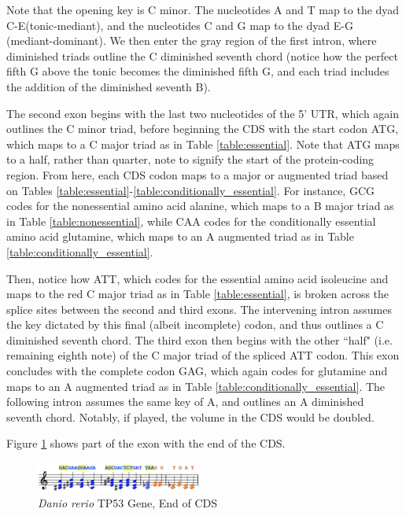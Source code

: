 \documentclass[letterpaper]{article}
\begin{document}
Note that the opening key is C minor. The nucleotides  A and T map to the dyad C-E\musFlat \;(tonic-mediant), and the nucleotides C and G map to the dyad E\musFlat-G (mediant-dominant). We then enter the gray region of the first intron, where diminished triads outline the C diminished seventh chord (notice how the perfect fifth G above the tonic becomes the diminished fifth G\musFlat, and each triad includes the addition of the diminished seventh B\musDoubleFlat).


The second exon begins with the last two nucleotides of the 5’ UTR, which again outlines the C minor triad, before beginning the CDS with the start codon ATG, which maps to a C major triad as in Table \ref{table:essential}. Note that ATG maps to a half, rather than quarter, note to signify the start of the protein-coding region. From here, each CDS codon maps to a major or augmented triad based on Tables  \ref{table:essential}-\ref{table:conditionally_essential}. For instance, GCG codes for the nonessential amino acid alanine, which maps to a B\musFlat\; major triad as in Table \ref{table:nonessential}, while CAA codes for the conditionally essential amino acid glutamine, which maps to an A augmented triad as in Table \ref{table:conditionally_essential}.

Then, notice how ATT, which codes for the essential amino acid isoleucine and maps to the red C\musSharp\; major triad as in Table \ref{table:essential}, is broken across the splice sites between the second and third exons. The intervening intron assumes the key dictated by this final (albeit incomplete) codon, and thus outlines a C\musSharp \; diminished seventh chord. The third exon then begins with the other ``half" (i.e.  remaining eighth note) of the C\musSharp\; major triad of the spliced ATT codon. This exon concludes with the complete codon GAG, which again codes for glutamine and maps to an A augmented triad as in Table \ref{table:conditionally_essential}. The following intron assumes the same key of A, and outlines an A \; diminished seventh chord. Notably, if played, the volume in the CDS would be doubled.

Figure \ref{fig:danio_rerio_end_translation} shows part of the exon with the end of the CDS. 

\begin{figure}[h!]
\centering
\vspace{-4mm}
\includegraphics[width=0.48\textwidth]{images/danio_rerio_end_translation}
  \caption{\textit{Danio rerio} TP53 Gene, End of CDS}
  \label{fig:danio_rerio_end_translation}
  \vspace{-4mm}
\end{figure}
\end{document}
